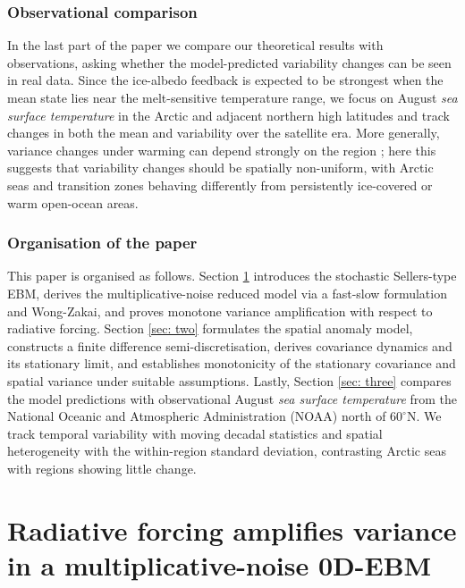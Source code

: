 \documentclass[10pt]{amsart}
\numberwithin{equation}{section}
\begin{document}
\subsubsection*{Observational comparison} In the last part of the paper we compare our theoretical results with observations, asking whether the model-predicted variability changes can be seen in real data. Since the ice-albedo feedback is expected to be strongest when the mean state lies near the melt-sensitive temperature range, we focus on August \emph{sea surface temperature} in the Arctic and adjacent northern high latitudes and track changes in both the mean and variability over the satellite era. More generally, variance changes under warming can depend strongly on the region \cite{Lewis2017}; here this suggests that variability changes should be spatially non-uniform, with Arctic seas and transition zones behaving differently from persistently ice-covered or warm open-ocean areas.

 



\subsubsection*{Organisation of the paper} 
This paper is organised as follows. Section \ref{sec: one} introduces the stochastic Sellers-type EBM, derives the multiplicative-noise reduced
model via a fast-slow formulation and Wong-Zakai, and proves monotone variance amplification with respect
to radiative forcing. Section \ref{sec: two} formulates the spatial anomaly model, constructs a finite
difference semi-discretisation, derives covariance dynamics and its stationary limit, and establishes
monotonicity of the stationary covariance and spatial variance under suitable assumptions. Lastly, Section \ref{sec: three} compares the model predictions with observational August \emph{sea surface temperature} from the National Oceanic and Atmospheric Administration (NOAA) north of $60^\circ$N. We track temporal variability with moving decadal statistics and spatial heterogeneity with the within-region standard deviation, contrasting Arctic seas with regions showing little change.




\section{Radiative forcing amplifies variance in a multiplicative-noise 0D-EBM}
\label{sec: one}
\end{document}

